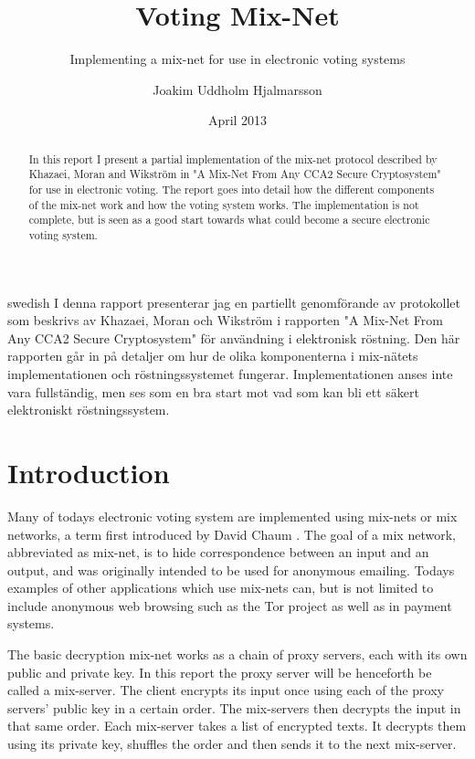 \documentclass[a4paper,11pt]{kth-mag}
\title{Voting Mix-Net}
\subtitle{Implementing a mix-net for use in electronic voting systems}
\author{Joakim Uddholm Hjalmarsson}
\date{April 2013}
\begin{document}
\frontmatter
\pagestyle{empty}
\removepagenumbers
\trita{}
\maketitle
{}
\begin{abstract}
In this report I present a partial implementation of the mix-net protocol described by Khazaei, Moran and Wikström in "A Mix-Net From Any CCA2 Secure Cryptosystem" for use in electronic voting. The report goes into detail how the different components of the mix-net work and how the voting system works. The implementation is not complete, but is seen as a good start towards what could become a secure electronic voting system.
\end{abstract}
\clearpage

\begin{foreignabstract}{swedish}
I denna rapport presenterar jag en partiellt genomförande av protokollet som beskrivs av Khazaei, Moran och Wikström i rapporten "A Mix-Net From Any CCA2 Secure Cryptosystem" för användning i elektronisk röstning. Den här rapporten går in på detaljer om hur de olika komponenterna i mix-nätets implementationen och röstningssystemet fungerar. Implementationen anses inte vara fullständig, men ses som en bra start mot vad som kan bli ett säkert elektroniskt röstningssystem.
\end{foreignabstract}
\clearpage
\tableofcontents*
\mainmatter

\chapter{Introduction}
Many of todays electronic voting system are implemented using mix-nets or mix networks, a term first introduced by David Chaum \cite{1}. The goal of a mix network, abbreviated as mix-net, is to hide correspondence between an input and an output, and was originally intended to be used for anonymous emailing. Todays examples of other applications which use mix-nets can, but is not limited to include anonymous web browsing such as the Tor project\cite{2} as well as in payment systems\cite{3}.

The basic decryption mix-net works as a chain of proxy servers, each with its own public and private key. In this report the proxy server will be henceforth be called a mix-server. The client encrypts its input once using each of the proxy servers’ public key in a certain order. The mix-servers then decrypts the input in that same order. Each mix-server takes a list of encrypted texts. It decrypts them using its private key, shuffles the order and then sends it to the next mix-server.
\end{document}
